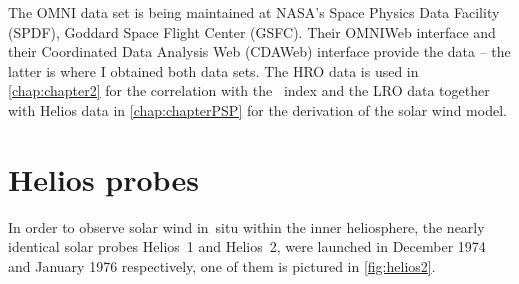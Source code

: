 The OMNI data set is being maintained at NASA's Space Physics Data Facility (SPDF), Goddard Space Flight Center (GSFC). Their OMNIWeb interface  and their Coordinated Data Analysis Web (CDAWeb) interface  provide the data -- the latter is where I obtained both data sets. The HRO data is used in \autoref{chap:chapter2} for the correlation with the \Kp~index and the LRO data together with Helios data in \autoref{chap:chapterPSP} for the derivation of the solar wind model.

\pagebreak


\section{Helios probes}
\label{sec:helios_probes}
In order to observe solar wind in~situ within the inner heliosphere, the nearly identical solar probes Helios~1 and Helios~2, were launched in December 1974 and January 1976 respectively, one of them is pictured in \autoref{fig:helios2}.
